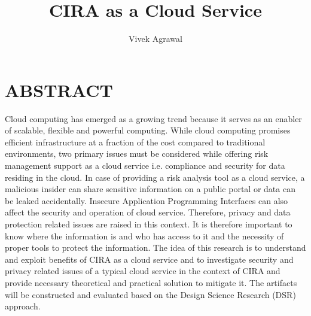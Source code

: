 \documentclass[a4paper,twoside,10pt]{report}
\begin{document}
\pagestyle{empty} %



\title{CIRA as a Cloud Service}
\author{Vivek Agrawal}
\maketitle



\tableofcontents %
\cleardoublepage %

\pagestyle{plain} %







\chapter{ABSTRACT}\label{Abstract}

Cloud computing has emerged as a growing trend because it serves as an enabler of scalable, flexible and powerful computing. While cloud computing promises efficient infrastructure at a fraction of the cost compared to traditional environments, two primary issues must be considered while offering risk management support as a cloud service i.e. compliance and security for data residing in the cloud. In case of providing a risk analysis tool as a cloud service, a malicious insider can share sensitive information on a public portal or data can be leaked accidentally. Insecure Application Programming Interfaces can also affect the security and operation of cloud service. Therefore, privacy and data protection related issues are raised in this context. It is therefore important to know where the information is and who has access to it and the necessity of proper tools to protect the information. The idea of this research is to understand and exploit benefits of CIRA as a cloud service and to investigate security and privacy related issues of a typical cloud service in the context of CIRA and provide necessary theoretical and practical solution to mitigate it. The artifacts will be constructed and evaluated based on the Design Science Research (DSR) approach.
\end{document}
